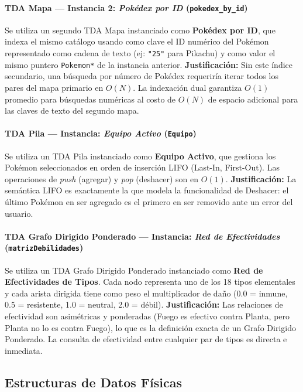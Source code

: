\documentclass[12pt, letterpaper]{article}
\begin{document}
\paragraph{TDA Mapa --- Instancia 2: \emph{Pokédex por ID} (\texttt{pokedex\_by\_id})}
Se utiliza un segundo TDA Mapa instanciado como \textbf{Pokédex por ID}, que indexa el mismo catálogo usando como clave el ID numérico del Pokémon representado como cadena de texto (ej: \texttt{"25"} para Pikachu) y como valor el mismo puntero \texttt{Pokemon*} de la instancia anterior. \textbf{Justificación:} Sin este índice secundario, una búsqueda por número de Pokédex requeriría iterar todos los pares del mapa primario en $O(N)$. La indexación dual garantiza $O(1)$ promedio para búsquedas numéricas al costo de $O(N)$ de espacio adicional para las claves de texto del segundo mapa.

\paragraph{TDA Pila --- Instancia: \emph{Equipo Activo} (\texttt{Equipo})}
Se utiliza un TDA Pila instanciado como \textbf{Equipo Activo}, que gestiona los Pokémon seleccionados en orden de inserción LIFO (Last-In, First-Out). Las operaciones de \emph{push} (agregar) y \emph{pop} (deshacer) son en $O(1)$. \textbf{Justificación:} La semántica LIFO es exactamente la que modela la funcionalidad de Deshacer: el último Pokémon en ser agregado es el primero en ser removido ante un error del usuario.

\paragraph{TDA Grafo Dirigido Ponderado --- Instancia: \emph{Red de Efectividades} (\texttt{matrizDebilidades})}
Se utiliza un TDA Grafo Dirigido Ponderado instanciado como \textbf{Red de Efectividades de Tipos}. Cada nodo representa uno de los 18 tipos elementales y cada arista dirigida tiene como peso el multiplicador de daño (0.0 = inmune, 0.5 = resistente, 1.0 = neutral, 2.0 = débil). \textbf{Justificación:} Las relaciones de efectividad son asimétricas y ponderadas (Fuego es efectivo contra Planta, pero Planta no lo es contra Fuego), lo que es la definición exacta de un Grafo Dirigido Ponderado. La consulta de efectividad entre cualquier par de tipos es directa e inmediata.

\subsection{Estructuras de Datos Físicas}
\end{document}
